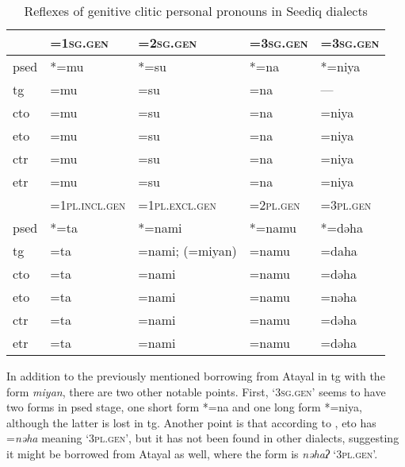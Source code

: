 \begin{table}[!htbp]
\centering
\caption{Reflexes of genitive clitic personal pronouns in Seediq dialects}
\label{tab:genclitic}
\begin{tabular}{lllll}
\hline
      & =\textsc{1sg.gen}      & =\textsc{2sg.gen}        & =\textsc{3sg.gen} & =\textsc{3sg.gen}       \\ \hline
\acs{psed} & *=mu          & *=su            & *=na     & *=niya         \\
\acs{tg}  & =mu           & =su             & =na      & ---            \\
\acs{cto}  & =mu           & =su             & =na      & =niya          \\
\acs{eto}  & =mu           & =su             & =na      & =niya          \\
\acs{ctr} & =mu           & =su             & =na      & =niya          \\
\acs{etr} & =mu           & =su             & =na      & =niya          \\ \hline
      & =\textsc{1pl.incl.gen} & =\textsc{1pl.excl.gen}   & =\textsc{2pl.gen} & =\textsc{3pl.gen}       \\ \hline
\acs{psed} & *=ta          & *=nami          & *=namu   & *=dəha         \\
\acs{tg}  & =ta           & =nami; (=miyan) & =namu    & =daha          \\
\acs{cto}  & =ta           & =nami           & =namu    & =dəha          \\
\acs{eto}  & =ta           & =nami           & =namu    & =nəha          \\
\acs{ctr} & =ta           & =nami           & =namu    & =dəha          \\
\acs{etr} & =ta           & =nami           & =namu    & =dəha     \\ \hline
\end{tabular}
\end{table}

In addition to the previously mentioned borrowing from Atayal in \acl{tg} with the form \textit{miyan}, there are two other notable points. First, `\textsc{3sg.gen}' seems to have two forms in \acl{psed} stage, one short form *=na and one long form *=niya, although the latter is lost in \acl{tg}. Another point is that according to \textcite{lee2015tawsa}, \acl{eto} has =\textit{nəha} meaning `\textsc{3pl.gen}', but it has not been found in other dialects, suggesting it might be borrowed from Atayal as well, where the form is \textit{nəhaʔ} `\textsc{3pl.gen}'.

